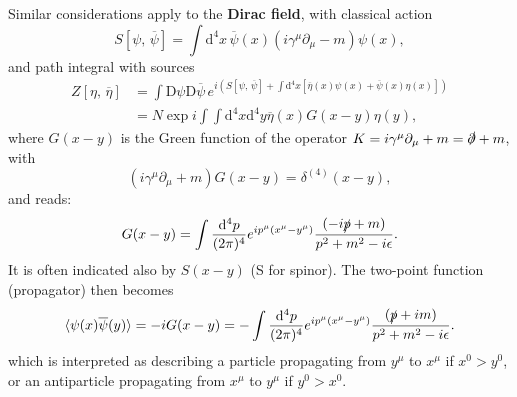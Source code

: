 \begin{example}
    Similar considerations apply to the \textbf{Dirac field}, with classical action
    \[
        S[\psi,\,\overline{\psi}] = \int \mathrm{d}^4 x \, \overline{\psi}(x) \left( i \gamma^\mu \partial_\mu - m \right) \psi(x),
    \]
    and path integral with sources
    \[
        \begin{aligned}
            Z[\eta,\,\overline{\eta}] & = \int \mathrm{D} \psi \mathrm{D} \overline{\psi} \, e^{i \left( S[\psi,\,\overline{\psi}] + \int \mathrm{d}^4 x \left[ \overline{\eta}(x) \psi(x) + \overline{\psi}(x) \eta(x) \right] \right)} \\
                                      & = N \exp{i \int \int \mathrm{d}^4 x \mathrm{d}^4 y \overline{\eta}(x) G(x - y) \eta(y)},
        \end{aligned}
    \]
    where \(G(x-y)\) is the Green function of the operator \(K = i \gamma^\mu \partial_\mu + m = \slashed{\partial} + m\), with
    \[
        \left( i \gamma^\mu \partial_\mu + m \right) G(x - y) = \delta^{(4)}(x - y),
    \]
    and reads:
    \[
        G(x-y) = \int \frac{\mathrm{d}^4 p}{(2\pi)^4} e^{i p^{\mu} (x^{\mu} - y^{\mu})} \frac{(-i\slashed{p} + m)}{p^2 + m^2 - i\epsilon}.
    \]
    It is often indicated also by \(S(x-y)\) (S for spinor). The two-point function (propagator) then becomes
    \[
        \langle \psi(x) \overline{\psi}(y) \rangle = -i G(x - y) = -\int \frac{\mathrm{d}^4 p}{(2\pi)^4} e^{i p^{\mu} (x^{\mu} - y^{\mu})} \frac{(\slashed{p} + im)}{p^2 + m^2 - i\epsilon}.
    \]
    which is interpreted as describing a particle propagating from \(y^{\mu}\)  to \(x^{\mu}\) if \(x^0 > y^0\), or an antiparticle propagating from \(x^{\mu}\) to \(y^{\mu}\) if \(y^0 > x^0\).
\end{example}

